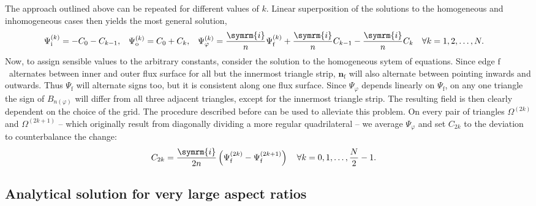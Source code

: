 \documentclass[a4paper, 10pt, english]{article}
\let\temp\varrho
\let\varrho\rho
\let\rho\temp
\let\temp\vartheta
\let\vartheta\theta
\let\theta\temp
\let\temp\varphi
\let\varphi\phi
\let\phi\temp
\let\vec\symbf
\newcommand*\im{\ensuremath{\symrm{i}}}  %
\newcommand*\fs{\ensuremath{\textrm{f}}}  %
\newcommand*\inw{\ensuremath{\textrm{i}}}  %
\newcommand*\out{\ensuremath{\textrm{o}}}  %
\begin{document}
The approach outlined above can be repeated for different values of $k$. Linear superposition of the solutions to the homogeneous and inhomogeneous cases then yields the most general solution,
\begin{align}
  \Psi_{\inw}^{(k)} &= -C_{0} - C_{k-1}, & \Psi_{\out}^{(k)} &= C_{0} + C_{k}, & \Psi_{\phi}^{(k)} &= \frac{\im}{n} \Psi_{\fs}^{(k)} + \frac{\im}{n} C_{k-1} - \frac{\im}{n} C_{k} \quad \forall k = 1, 2, \dotsc, N.
\end{align}
Now, to assign sensible values to the arbitrary constants, consider the solution to the homogeneous sytem of equations. Since edge \fs\ alternates between inner and outer flux surface for all but the innermost triangle strip, $\vec{n}_{\fs}$ will also alternate between pointing inwards and outwards. Thus $\Psi_{\fs}$ will alternate signs too, but it is consistent along one flux surface. Since $\Psi_{\phi}$ depends linearly on $\Psi_{\fs}$, on any one triangle the sign of $B_{n (\phi)}$ will differ from all three adjacent triangles, except for the innermost triangle strip. The resulting field is then clearly dependent on the choice of the grid. The procedure described before can be used to alleviate this problem. On every pair of triangles $\Omega^{(2k)}$ and $\Omega^{(2k+1)}$ -- which originally result from diagonally dividing a more regular quadrilateral -- we average $\Psi_{\phi}$ and set $C_{2k}$ to the deviation to counterbalance the change:
\begin{align}
  C_{2k} &= \frac{\im}{2 n} \left( \Psi_{\fs}^{(2k)} - \Psi_{\fs}^{(2k+1)} \right) \quad \forall k = 0, 1, \dotsc, \frac{N}{2} - 1.
\end{align}

\subsection{Analytical solution for very large aspect ratios}
\end{document}
